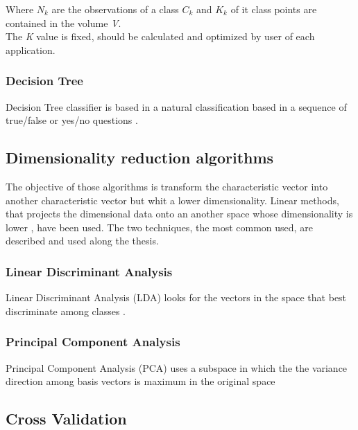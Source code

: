 Where $N_k$ are the observations of a class $C_k$ and $K_k$ of it class points are contained in the volume \textit{V}.\\

The \textit{K} value is fixed, should be calculated and optimized by user of each application.\\

\subsubsection{Decision Tree}
Decision Tree classifier is based in a natural classification based in a sequence of true/false or yes/no questions \cite{Duda}.\\




\subsection{Dimensionality reduction algorithms}
The objective of those algorithms is transform the characteristic vector into another characteristic vector but whit a lower dimensionality. Linear methods, that projects the dimensional data onto an another space whose dimensionality is lower \cite{Duda}, have been used. The two techniques, the most common used, are described and used along the thesis.\\
\subsubsection{Linear Discriminant Analysis}
Linear Discriminant Analysis (LDA) looks for the vectors in the space that best discriminate among classes \cite{PCAvsLDA}.

\subsubsection{Principal Component Analysis}
Principal Component Analysis (PCA) uses a subspace in which the the variance direction among basis vectors is maximum in the original space \cite{PCAvsLDA}

\subsection{Cross Validation}
